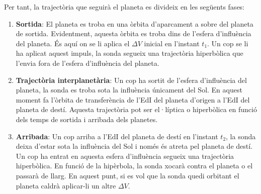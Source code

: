 Per tant, la trajectòria que seguirà el planeta es divideix en les següents fases:
\begin{enumerate}
	\item \textbf{Sortida}: El planeta es troba en una òrbita d'aparcament a sobre del planeta de sortida. Evidentment, aquesta òrbita es troba dins de l'esfera d'influència del planeta. És aquí on se li aplica el $\Delta V$ inicial en l'instant $t_{1}$. Un cop se li ha aplicat aquest impuls, la sonda segueix una trajectòria hiperbòlica que l'envia fora de l'esfera d'influència del planeta.
	\item \textbf{Trajectòria interplanetària}: Un cop ha sortit de l'esfera d'influència del planeta, la sonda es troba sota la influència únicament del Sol. En aquest moment fa l'òrbita de transferència de l'EdI del planeta d'origen a l'EdI del planeta de destí. Aquesta trajectòria pot ser el·líptica o hiperbòlica en funció dels temps de sortida i arribada dels planetes.
	\item \textbf{Arribada}: Un cop arriba a l'EdI del planeta de destí en l'instant $t_{2}$, la sonda deixa d'estar sota la influència del Sol i només és atreta pel planeta de destí. Un cop ha entrat en aquesta esfera d'influència segueix una trajectòria hiperbòlica. En funció de la hipèrbola, la sonda xocarà contra el planeta o el passarà de llarg. En aquest punt, si es vol que la sonda quedi orbitant el planeta caldrà aplicar-li un altre $\Delta V$.
\end{enumerate}
